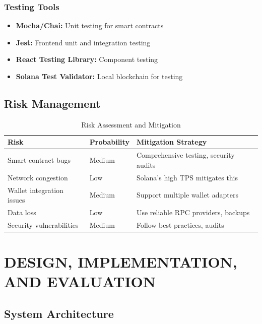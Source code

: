 \documentclass[a4paper,13pt,twoside]{report}
\theoremstyle{definition}
\begin{document}
\subsection{Testing Tools}

\begin{itemize}
    \item \textbf{Mocha/Chai:} Unit testing for smart contracts
    \item \textbf{Jest:} Frontend unit and integration testing
    \item \textbf{React Testing Library:} Component testing
    \item \textbf{Solana Test Validator:} Local blockchain for testing
\end{itemize}

\section{Risk Management}

\begin{table}[h]
\centering
\caption{Risk Assessment and Mitigation}
\small
\begin{tabular}{|p{4cm}|p{3cm}|p{5cm}|}
\hline
\textbf{Risk} & \textbf{Probability} & \textbf{Mitigation Strategy} \\
\hline
Smart contract bugs & Medium & Comprehensive testing, security audits \\
Network congestion & Low & Solana's high TPS mitigates this \\
Wallet integration issues & Medium & Support multiple wallet adapters \\
Data loss & Low & Use reliable RPC providers, backups \\
Security vulnerabilities & Medium & Follow best practices, audits \\
\hline
\end{tabular}
\end{table}

\newpage
\chapter{DESIGN, IMPLEMENTATION, AND EVALUATION}
\label{chapter:Experiment}

\section{System Architecture}
\end{document}
